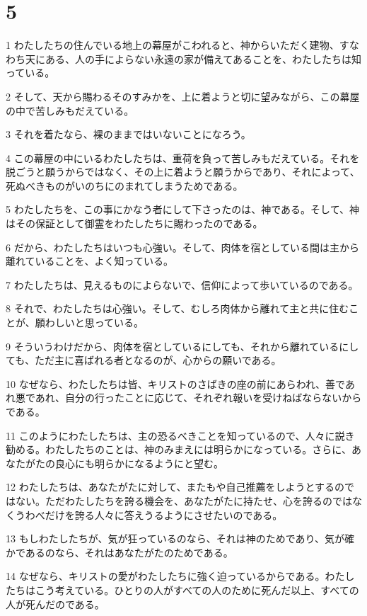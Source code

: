 \chapter{5}

\par 1 わたしたちの住んでいる地上の幕屋がこわれると、神からいただく建物、すなわち天にある、人の手によらない永遠の家が備えてあることを、わたしたちは知っている。
\par 2 そして、天から賜わるそのすみかを、上に着ようと切に望みながら、この幕屋の中で苦しみもだえている。
\par 3 それを着たなら、裸のままではいないことになろう。
\par 4 この幕屋の中にいるわたしたちは、重荷を負って苦しみもだえている。それを脱ごうと願うからではなく、その上に着ようと願うからであり、それによって、死ぬべきものがいのちにのまれてしまうためである。
\par 5 わたしたちを、この事にかなう者にして下さったのは、神である。そして、神はその保証として御霊をわたしたちに賜わったのである。
\par 6 だから、わたしたちはいつも心強い。そして、肉体を宿としている間は主から離れていることを、よく知っている。
\par 7 わたしたちは、見えるものによらないで、信仰によって歩いているのである。
\par 8 それで、わたしたちは心強い。そして、むしろ肉体から離れて主と共に住むことが、願わしいと思っている。
\par 9 そういうわけだから、肉体を宿としているにしても、それから離れているにしても、ただ主に喜ばれる者となるのが、心からの願いである。
\par 10 なぜなら、わたしたちは皆、キリストのさばきの座の前にあらわれ、善であれ悪であれ、自分の行ったことに応じて、それぞれ報いを受けねばならないからである。
\par 11 このようにわたしたちは、主の恐るべきことを知っているので、人々に説き勧める。わたしたちのことは、神のみまえには明らかになっている。さらに、あなたがたの良心にも明らかになるようにと望む。
\par 12 わたしたちは、あなたがたに対して、またもや自己推薦をしようとするのではない。ただわたしたちを誇る機会を、あなたがたに持たせ、心を誇るのではなくうわべだけを誇る人々に答えうるようにさせたいのである。
\par 13 もしわたしたちが、気が狂っているのなら、それは神のためであり、気が確かであるのなら、それはあなたがたのためである。
\par 14 なぜなら、キリストの愛がわたしたちに強く迫っているからである。わたしたちはこう考えている。ひとりの人がすべての人のために死んだ以上、すべての人が死んだのである。
